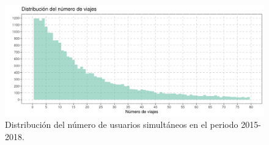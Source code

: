 \begin{figure}[H]
    \centering
    \includegraphics[width=16cm]{Graphics/distribution_count_travel.png}
    \caption{Distribución del número de usuarios simultáneos en el periodo 2015-2018.}
    \label{fig:distribution_count_travel}
\end{figure}